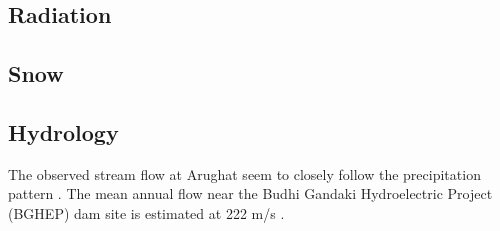 \subsection{Radiation}

\subsection{Snow}

\subsection{Hydrology}
The observed stream flow at Arughat seem to closely follow the precipitation pattern \autocite{marahattaApplicationSWATHydrological2021}. The mean annual flow near the Budhi Gandaki Hydroelectric Project (BGHEP) dam site is estimated at 222 m/s \autocite{dordeFeasibilityStudyDetailed2015}.




